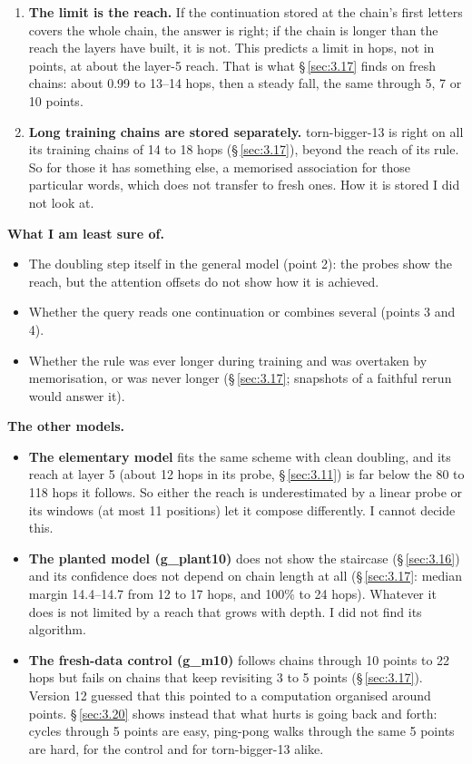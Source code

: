 \documentclass[paper=a4,fontsize=11pt,DIV=11,parskip=half,headings=small,numbers=noendperiod]{scrartcl}
\DeclareRobustCommand{\lead}[1]{\textsf{\bfseries\color{accent}#1}}
\DeclareRobustCommand{\code}[1]{{\fontseries{m}\ttfamily #1}}
\begin{document}
\begin{enumerate}
\item \lead{The limit is the reach.} If the continuation stored at the chain’s first letters covers the whole
  chain, the answer is right; if the chain is longer than the reach the layers have built, it is not. This
  predicts a limit in hops, not in points, at about the layer-5 reach. That is what \S\,\ref{sec:3.17} finds on
  fresh chains: about 0.99 to 13–14 hops, then a steady fall, the same through 5, 7 or 10 points.
\item \lead{Long training chains are stored separately.} \code{torn-\allowbreak{}bigger-\allowbreak{}13} is
  right on all its training chains of 14 to 18 hops (\S\,\ref{sec:3.17}), beyond the reach of its rule. So for
  those it has something else, a memorised association for those particular words, which does not transfer to
  fresh ones. How it is stored I did not look at.
\end{enumerate}

\lead{What I am least sure of.}

\begin{itemize}
\item The doubling step itself in the general model (point 2): the probes show the reach, but the attention
  offsets do not show how it is achieved.
\item Whether the query reads one continuation or combines several (points 3 and 4).
\item Whether the rule was ever longer during training and was overtaken by memorisation, or was never longer
  (\S\,\ref{sec:3.17}; snapshots of a faithful rerun would answer it).
\end{itemize}

\lead{The other models.}

\begin{itemize}
\item \lead{The elementary model} fits the same scheme with clean doubling, and its reach at layer 5 (about 12
  hops in its probe, \S\,\ref{sec:3.11}) is far below the 80 to 118 hops it follows. So either the reach is
  underestimated by a linear probe or its windows (at most 11 positions) let it compose differently. I cannot
  decide this.
\item \lead{The planted model (\code{g\_\allowbreak{}plant10})} does not show the staircase (\S\,\ref{sec:3.16})
  and its confidence does not depend on chain length at all (\S\,\ref{sec:3.17}: median margin 14.4–14.7 from 12
  to 17 hops, and 100\% to 24 hops). Whatever it does is not limited by a reach that grows with depth. I did not
  find its algorithm.
\item \lead{The fresh-data control (\code{g\_\allowbreak{}m10})} follows chains through 10 points to 22 hops but
  fails on chains that keep revisiting 3 to 5 points (\S\,\ref{sec:3.17}). Version 12 guessed that this pointed
  to a computation organised around points. \S\,\ref{sec:3.20} shows instead that what hurts is going back and
  forth: cycles through 5 points are easy, ping-pong walks through the same 5 points are hard, for the control
  and for \code{torn-\allowbreak{}bigger-\allowbreak{}13} alike.
\end{itemize}
\end{document}
